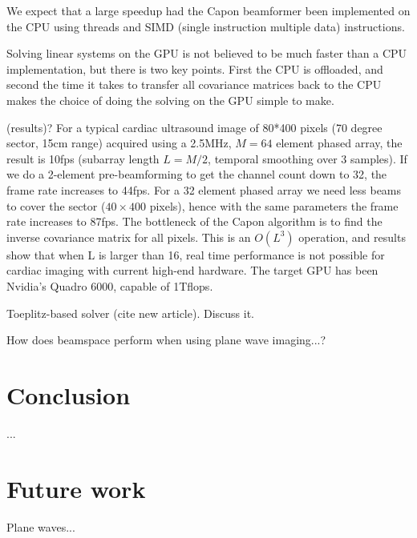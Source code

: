 \documentclass[12pt,journal,onecolumn]{IEEEtran}
\begin{document}
We expect that a large speedup had the Capon beamformer been implemented on the CPU using threads and SIMD (single instruction multiple data) instructions. 

Solving linear systems on the GPU is not believed to be much faster than a CPU implementation, but there is two key points. First the CPU is offloaded, and second the time it takes to transfer all covariance matrices back to the CPU makes the choice of doing the solving on the GPU simple to make.

(results)?
For a typical cardiac ultrasound image of 80*400 pixels (70 degree sector, 15cm range) acquired using a 2.5MHz, $M=64$ element phased array, the result is 10fps (subarray length $L=M/2$, temporal smoothing over 3 samples). If we do a 2-element pre-beamforming to get the channel count down to 32, the frame rate increases to 44fps. For a 32 element phased array we need less beams to cover the sector ($40 \times 400$ pixels), hence with the same parameters the frame rate increases to 87fps. The bottleneck of the Capon algorithm is to find the inverse covariance matrix for all pixels. This is an $O(L^3)$ operation, and results show that when L is larger than 16, real time performance is not possible for cardiac imaging with current high-end hardware. The target GPU has been Nvidia’s Quadro 6000, capable of 1Tflops.

Toeplitz-based solver (cite new article). Discuss it.

How does beamspace perform when using plane wave imaging...?

\section{Conclusion}\label{sec:con}
...

\section{Future work}
Plane waves...

%
%
\end{document}
